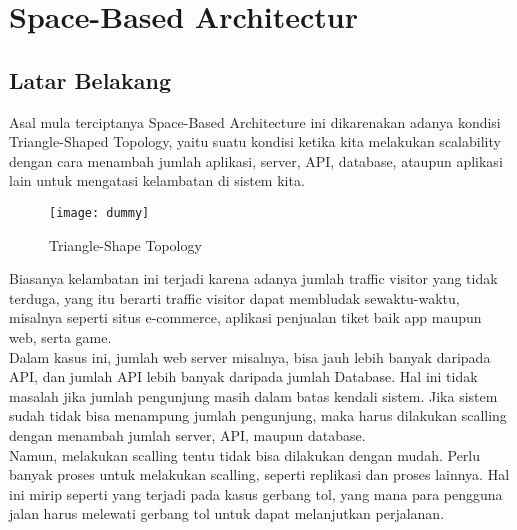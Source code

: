 %
	\chapter{Space-Based Architectur}
	\section*{\huge{Latar Belakang}}
	\large Asal mula terciptanya Space-Based Architecture ini dikarenakan adanya kondisi Triangle-Shaped Topology, yaitu suatu kondisi ketika kita melakukan scalability dengan cara menambah jumlah aplikasi, server, API, database, ataupun aplikasi lain untuk mengatasi kelambatan di sistem kita.\\
	\vskip0.15cm
	\begin{figure}
		\centering
		\texttt{[image: dummy]}
		\caption{Triangle-Shape Topology}
	\end{figure}
	\vskip0.15cm
	Biasanya kelambatan ini terjadi karena adanya jumlah traffic visitor yang tidak terduga, yang itu berarti traffic visitor dapat membludak sewaktu-waktu, misalnya seperti situs e-commerce, aplikasi penjualan tiket baik app maupun web, serta game.\\
	
	Dalam kasus ini, jumlah web server misalnya, bisa jauh lebih banyak daripada API, dan jumlah API lebih banyak daripada jumlah Database. Hal ini tidak masalah jika jumlah pengunjung masih dalam batas kendali sistem. Jika sistem sudah tidak bisa menampung jumlah pengunjung, maka harus dilakukan scalling dengan menambah jumlah server, API, maupun database.\\
	
	Namun, melakukan scalling tentu tidak bisa dilakukan dengan mudah. Perlu banyak proses untuk melakukan scalling, seperti replikasi dan proses lainnya. Hal ini mirip seperti yang terjadi pada kasus gerbang tol, yang mana para pengguna jalan harus melewati gerbang tol untuk dapat melanjutkan perjalanan.\\
	
